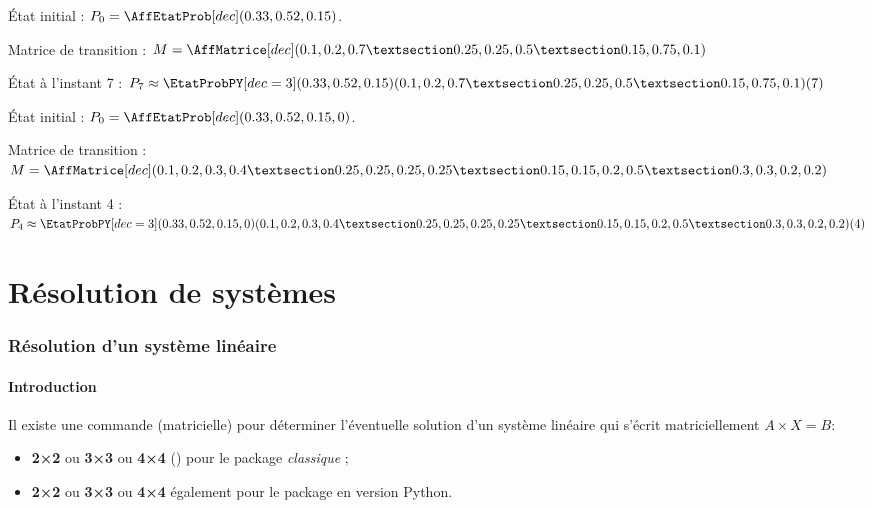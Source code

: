 \documentclass[french,a4paper,11pt]{article}
\newcommand\cmaj[1]{\tcbox[vignetteMaJ]{#1}\xspace}
\begin{document}
\begin{PresentationCode}{}
État initial : $P_0 = \AffEtatProb[dec](0.33,0.52,0.15)$.

Matrice de transition :
$M=\AffMatrice[dec]%
(0.1,0.2,0.7 § 0.25,0.25,0.5 § 0.15,0.75,0.1)$

État à l'instant 7 :
$P_7 \approx \EtatProbPY[dec=3]
	(0.33,0.52,0.15)%
	(0.1,0.2,0.7 § 0.25,0.25,0.5 § 0.15,0.75,0.1)
	(7)$
\end{PresentationCode}

\begin{PresentationCode}{}
État initial : $P_0 = \AffEtatProb[dec](0.33,0.52,0.15,0)$.

Matrice de transition :
$M=\AffMatrice[dec]%
(0.1,0.2,0.3,0.4 § 0.25,0.25,0.25,0.25 § 0.15,0.15,0.2,0.5 § 0.3,0.3,0.2,0.2)$

État à l'instant 4 :
$P_4 \approx \EtatProbPY[dec=3]
	(0.33,0.52,0.15,0)%
	(0.1,0.2,0.3,0.4 § 0.25,0.25,0.25,0.25 § 0.15,0.15,0.2,0.5 § 0.3,0.3,0.2,0.2)%
	(4)$
\end{PresentationCode}

\pagebreak

\part{Résolution de systèmes}

\section{Résolution d'un système linéaire}

\subsection{Introduction}

\begin{cautionblock}
Il existe une commande (matricielle) pour déterminer l'éventuelle solution d'un système linéaire qui s'écrit matriciellement $A\times X=B$:

\begin{itemize}
	\item \textbf{2×2} ou \textbf{3×3} ou \textbf{4×4} (\cmaj{0.1.5}) pour le package \textit{classique} ;
	\item \textbf{2×2} ou \textbf{3×3} ou \textbf{4×4} également pour le package en version \textsf{Python}.
\end{itemize}
\vspace*{-\baselineskip}\leavevmode
\end{cautionblock}
\end{document}
